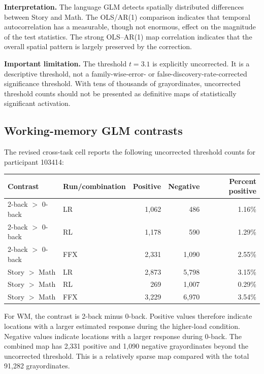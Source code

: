 \documentclass[11pt,a4paper]{article}
\begin{document}
\textbf{Interpretation.} The language GLM detects spatially distributed differences between Story and Math. The OLS/AR(1) comparison indicates that temporal autocorrelation has a measurable, though not enormous, effect on the magnitude of the test statistics. The strong OLS--AR(1) map correlation indicates that the overall spatial pattern is largely preserved by the correction.

\textbf{Important limitation.} The threshold \(t=3.1\) is explicitly uncorrected. It is a descriptive threshold, not a family-wise-error- or false-discovery-rate-corrected significance threshold. With tens of thousands of grayordinates, uncorrected threshold counts should not be presented as definitive maps of statistically significant activation.

\subsection{Working-memory GLM contrasts}

The revised cross-task cell reports the following uncorrected threshold counts for participant 103414:

\begin{center}
\begin{tabular}{llrrr}
\toprule
\textbf{Contrast} & \textbf{Run/combination} & \textbf{Positive} & \textbf{Negative} & \textbf{Percent positive}\\
\midrule
2-back \(>\) 0-back & LR & 1,062 & 486 & 1.16\%\\
2-back \(>\) 0-back & RL & 1,178 & 590 & 1.29\%\\
2-back \(>\) 0-back & FFX & 2,331 & 1,090 & 2.55\%\\
Story \(>\) Math & LR & 2,873 & 5,798 & 3.15\%\\
Story \(>\) Math & RL & 269 & 1,007 & 0.29\%\\
Story \(>\) Math & FFX & 3,229 & 6,970 & 3.54\%\\
\bottomrule
\end{tabular}
\end{center}

For WM, the contrast is 2-back minus 0-back. Positive values therefore indicate locations with a larger estimated response during the higher-load condition. Negative values indicate locations with a larger response during 0-back. The combined map has 2,331 positive and 1,090 negative grayordinates beyond the uncorrected threshold. This is a relatively sparse map compared with the total 91,282 grayordinates.
\end{document}

